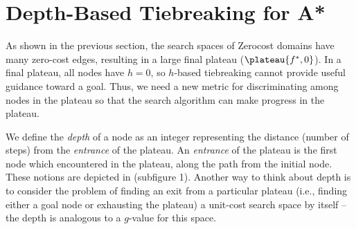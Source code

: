 \section{Depth-Based Tiebreaking for A*}

\label{sec:depth}

As shown in the previous section, the search spaces of Zerocost domains have many zero-cost edges,
resulting in a large final plateau ($\plateau{f^*,0}$). In a final plateau,
all nodes have $h=0$, so $h$-based tiebreaking cannot provide
useful guidance toward a goal. Thus, we need a new metric for discriminating among nodes
in the plateau so that the search algorithm can make progress in the plateau.

We define the \emph{depth} of a node as an 
integer representing the distance (number of steps) from the
\emph{entrance} of the plateau.  An \emph{entrance} of the plateau is
the first node which encountered in the plateau, along the path from the
initial node. These notions are depicted in
 (subfigure 1). 
Another way to think about depth is to consider the problem of finding an exit from a particular plateau (i.e., finding either a goal node or exhausting the plateau) a unit-cost search space by itself -- the depth is analogous to a $g$-value for this space.

